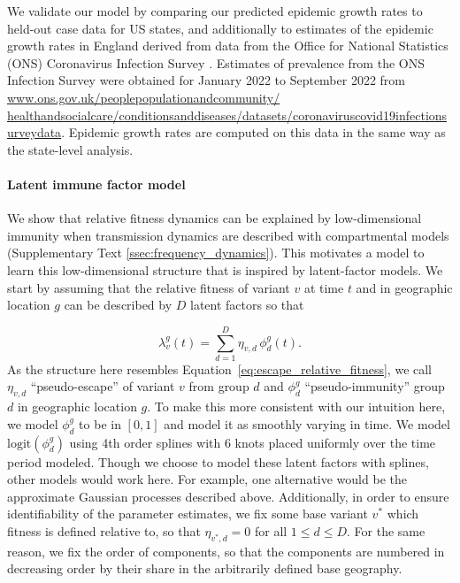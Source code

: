 \documentclass[11pt,oneside,letterpaper]{article}
\newcommand{\varEscape}{\eta}
\begin{document}
We validate our model by comparing our predicted epidemic growth rates to held-out case data for US states, and additionally to estimates of the epidemic growth rates in England derived from data from the Office for National Statistics (ONS) Coronavirus Infection Survey \cite{pouwels2021community}.
Estimates of prevalence from the ONS Infection Survey were obtained for January 2022 to September 2022 from \href{https://www.ons.gov.uk/peoplepopulationandcommunity/healthandsocialcare/conditionsanddiseases/datasets/coronaviruscovid19infectionsurveydata}{www.ons.gov.uk/peoplepopulationandcommunity/ healthandsocialcare/conditionsanddiseases/datasets/coronaviruscovid19infectionsurveydata}.
Epidemic growth rates are computed on this data in the same way as the state-level analysis.

\paragraph{Latent immune factor model}

We show that relative fitness dynamics can be explained by low-dimensional immunity when transmission dynamics are described with compartmental models (Supplementary Text \ref{ssec:frequency_dynamics}).
This motivates a model to learn this low-dimensional structure that is inspired by latent-factor models.
We start by assuming that the relative fitness of variant $v$ at time $t$ and in geographic location $g$ can be described by $D$ latent factors so that

\begin{equation}
    \lambda_{v}^{g}(t) = \sum_{d=1}^{D} \varEscape_{v,d} \, \phi_{d}^{g}(t).
\end{equation}
As the structure here resembles Equation~\ref{eq:escape_relative_fitness}, we call $\varEscape_{v,d}$ ``pseudo-escape'' of variant $v$ from group $d$ and $\phi_{d}^{g}$ ``pseudo-immunity'' group $d$ in geographic location $g$.
To make this more consistent with our intuition here, we model $\phi_{d}^{g}$ to be in $[0,1]$ and model it as smoothly varying in time.
We model $\text{logit}(\phi_{d}^{g})$ using 4th order splines with 6 knots placed uniformly over the time period modeled.
Though we choose to model these latent factors with splines, other models would work here.
For example, one alternative would be the approximate Gaussian processes described above.
Additionally, in order to ensure identifiability of the parameter estimates, we fix some base variant $v^*$ which fitness is defined relative to, so that $\varEscape_{v^*, d} = 0$ for all $1\leq d\leq D$.
For the same reason, we fix the order of components, so that the components are numbered in decreasing order by their share in the arbitrarily defined base geography.
\end{document}
